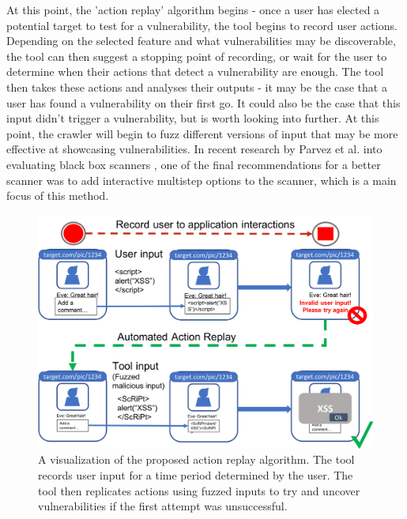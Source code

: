 \begin{itemize}
	At this point, the 'action replay' algorithm begins - once a user has elected a potential target to test for a vulnerability, the tool begins to record user actions. Depending on the selected feature and what vulnerabilities may be discoverable, the tool can then suggest a stopping point of recording, or wait for the user to determine when their actions that detect a vulnerability are enough. The tool then takes these actions and analyses their outputs - it may be the case that a user has found a vulnerability on their first go. It could also be the case that this input didn't trigger a vulnerability, but is worth looking into further. At this point, the crawler will begin to fuzz different versions of input that may be more effective at showcasing vulnerabilities. In recent research by Parvez et al. into evaluating black box scanners \cite{analysisOfEffectivenessOfBlackBoxWebAppScannersStoredSQLStoredXSS}, one of the final recommendations for a better scanner was to add interactive multistep options to the scanner, which is a main focus of this method. \\
	
	\begin{figure}[h]
		\centering
		\includegraphics[width=\textwidth]{images/action_replay.png}
		\caption{A visualization of the proposed action replay algorithm. The tool records user input for a time period determined by the user. The tool then replicates actions using fuzzed inputs to try and uncover vulnerabilities if the first attempt was unsuccessful.}
		\label{fig:test}
	\end{figure}
	

\end{itemize}
